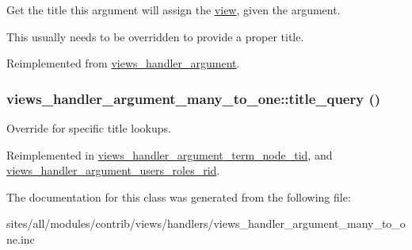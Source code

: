 Get the title this argument will assign the \hyperlink{classview}{view}, given the argument.

This usually needs to be overridden to provide a proper title. 

Reimplemented from \hyperlink{classviews__handler__argument_76181ac24e7be4a09aaafc1fa5f15ea1}{views\_\-handler\_\-argument}.\hypertarget{classviews__handler__argument__many__to__one_0b758f84ee6b9a473313ec92714b06c7}{
\subsubsection[{title\_\-query}]{\setlength{\rightskip}{0pt plus 5cm}views\_\-handler\_\-argument\_\-many\_\-to\_\-one::title\_\-query ()}}
\label{classviews__handler__argument__many__to__one_0b758f84ee6b9a473313ec92714b06c7}


Override for specific title lookups. 

Reimplemented in \hyperlink{classviews__handler__argument__term__node__tid_9f858ee5c343f6a14b87a320316710f0}{views\_\-handler\_\-argument\_\-term\_\-node\_\-tid}, and \hyperlink{classviews__handler__argument__users__roles__rid_0cc229ef972f8a7d9184b45443271992}{views\_\-handler\_\-argument\_\-users\_\-roles\_\-rid}.

The documentation for this class was generated from the following file:\begin{CompactItemize}
\item 
sites/all/modules/contrib/views/handlers/views\_\-handler\_\-argument\_\-many\_\-to\_\-one.inc\end{CompactItemize}
